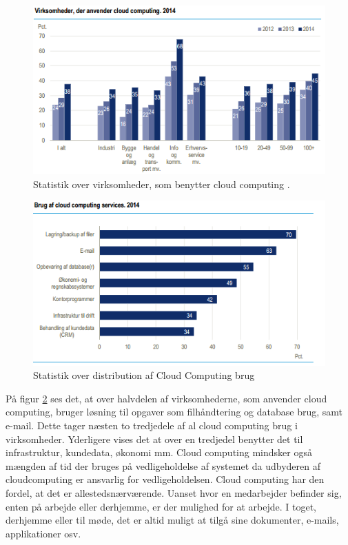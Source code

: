\begin{figure}[p]
    \centering
    \includegraphics[width=1\textwidth]{figures/virksomhederderanvendercc.png}
    \caption{Statistik over virksomheder, som benytter cloud computing \citep{itvirk}.} 
    \label{fig:virksomcc}
\end{figure}

\begin{figure}[p]
    \centering
    \includegraphics[width=1\textwidth]{figures/brugafccservices.png}
    \caption{Statistik over distribution af Cloud Computing brug \citep{itvirk}}
    \label{fig:distcc}
\end{figure}

\newpage
På figur \ref{fig:distcc} ses det, at over halvdelen af virksomhederne, som anvender cloud computing, bruger løsning til opgaver som filhåndtering og database brug, samt e-mail. Dette tager næsten to tredjedele af al cloud computing brug i virksomheder. Yderligere vises det at over en tredjedel benytter det til infrastruktur, kundedata, økonomi mm. Cloud computing mindsker også mængden af tid der bruges på vedligeholdelse af systemet da udbyderen af cloudcomputing er ansvarlig for vedligeholdelsen. Cloud computing har den fordel, at det er allestedsnærværende. Uanset hvor en medarbejder befinder sig, enten på arbejde eller derhjemme, er der mulighed for at arbejde. I toget, derhjemme eller til møde, det er altid muligt at tilgå sine dokumenter, e-mails, applikationer osv.

